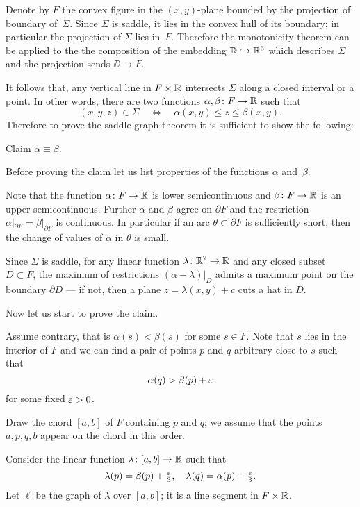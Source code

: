 \documentclass{article}
\begin{document}
Denote by $F$ the convex figure in the $(x,y)$-plane bounded by the projection of boundary of~$\Sigma$.
Since $\Sigma$ is saddle, it lies in the convex hull of its boundary;
in particular the projection of $\Sigma$ lies in~$F$.
Therefore the monotonicity theorem can be applied to the
the composition of the embedding $\mathbb{D}\hookrightarrow \mathbb{R}^3$ which describes $\Sigma$ and the projection sends $\DD\to F$.

It follows that, any vertical line in $F\times \mathbb{R}$ intersects $\Sigma$ along a closed interval or a point.
In other words, there are two functions $\alpha,\beta\colon F\to \mathbb{R}$
such that 
\[(x,y,z)\in \Sigma
\quad\iff\quad
\alpha(x,y)\le z\le \beta(x,y).\]
Therefore to prove the saddle graph theorem it is sufficient to show the following:

\begin{thm}{Claim}
$\alpha\equiv \beta$.
\end{thm}

Before proving the claim let us list properties of the functions $\alpha$ and~$\beta$. 

Note that the function $\alpha\colon F\to \mathbb{R}$ is lower semicontinuous
and $\beta\colon F\to \mathbb{R}$ is an upper semicontinuous.
Further $\alpha$ and $\beta$ agree on $\partial F$ and the 
restriction $\alpha|_{\partial F}=\beta|_{\partial F}$ is continuous.
In particular if an arc $\theta\subset \partial F$ is sufficiently short, then
the change of values of $\alpha$ in $\theta$ is small.

Since $\Sigma$ is saddle, for any linear function $\lambda\colon\mathbb{R}^2\to\mathbb{R}$ and any closed subset $D\subset F$, 
the maximum of restrictions $(\alpha-\lambda)|_D$ admits a maximum point on the boundary $\partial D$ --- if not, then a plane $z=\lambda(x,y)+c$ cuts a hat in $D$.

Now let us start to prove the claim.

Assume contrary, that is $\alpha(s)<\beta(s)$ for some $s\in F$.
Note that $s$ lies in the interior of $F$ and we can find a pair of points $p$ and $q$ arbitrary close to $s$
such that 
\[\alpha(q)>\beta(p)+\varepsilon\]
for some fixed $\varepsilon>0$.

Draw the chord $[a,b]$ of $F$ containing $p$ and $q$;
we assume that the points $a,p,q,b$ appear on the chord in this order.

Consider the linear function $\lambda\colon[a,b]\to \mathbb{R}$ such that 
\[\lambda(p)=\beta(p)+\tfrac{\varepsilon}3,\quad\lambda(q)=\alpha(p)-\tfrac{\varepsilon}3.\]
Let $\ell$ be the graph of $\lambda$ over $[a,b]$; it is a line segment in $F\times \mathbb{R}$.
\end{document}
